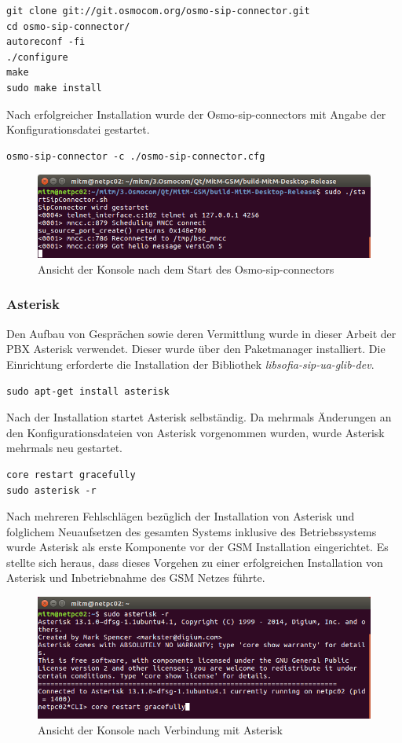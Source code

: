 \begin{lstlisting}
git clone git://git.osmocom.org/osmo-sip-connector.git
cd osmo-sip-connector/
autoreconf -fi
./configure
make
sudo make install
\end{lstlisting} 

Nach erfolgreicher Installation wurde der Osmo-sip-connectors mit Angabe der Konfigurationsdatei gestartet.

\begin{lstlisting}
osmo-sip-connector -c ./osmo-sip-connector.cfg
\end{lstlisting} 

\begin{figure}[h] %
\centering
\includegraphics[width=15cm]{includes/Start_SipConnector}
\caption{Ansicht der Konsole nach dem Start des Osmo-sip-connectors}
\label{fig:Asterisk}
\end{figure}
 
\subsubsection{Asterisk}
Den Aufbau von Gesprächen sowie deren Vermittlung wurde in dieser Arbeit der PBX Asterisk verwendet. Dieser wurde über den Paketmanager installiert. Die Einrichtung erforderte die Installation der Bibliothek \textit{libsofia-sip-ua-glib-dev}.

\begin{lstlisting}
sudo apt-get install asterisk
\end{lstlisting}

Nach der Installation startet Asterisk selbständig. Da mehrmals Änderungen an den Konfigurationsdateien von Asterisk vorgenommen wurden, wurde Asterisk mehrmals neu gestartet.

\begin{lstlisting}
core restart gracefully
sudo asterisk -r
\end{lstlisting}

Nach mehreren Fehlschlägen bezüglich der Installation von Asterisk und folglichem Neuaufsetzen des gesamten Systems inklusive des Betriebssystems wurde Asterisk als erste Komponente vor der GSM Installation eingerichtet. Es stellte sich heraus, dass dieses Vorgehen zu einer erfolgreichen Installation von Asterisk und Inbetriebnahme des GSM Netzes führte.

\begin{figure}[h] %
\centering
\includegraphics[width=15cm]{includes/Asterisk}
\caption{Ansicht der Konsole nach Verbindung mit Asterisk}
\label{fig:Asterisk}
\end{figure}